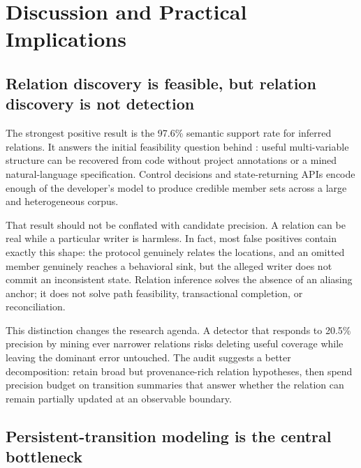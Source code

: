 
\section{Discussion and Practical Implications}
\label{s:discussion}

\subsection{Relation discovery is feasible, but relation discovery is not detection}
\label{s:discussion-relations}

The strongest positive result is the 97.6\% semantic support rate for inferred relations. It answers the initial feasibility question behind \sys: useful multi-variable structure can be recovered from code without project annotations or a mined natural-language specification. Control decisions and state-returning APIs encode enough of the developer's model to produce credible member sets across a large and heterogeneous corpus.

That result should not be conflated with candidate precision. A relation can be real while a particular writer is harmless. In fact, most false positives contain exactly this shape: the protocol genuinely relates the locations, and an omitted member genuinely reaches a behavioral sink, but the alleged writer does not commit an inconsistent state. Relation inference solves the absence of an aliasing anchor; it does not solve path feasibility, transactional completion, or reconciliation.

This distinction changes the research agenda. A detector that responds to 20.5\% precision by mining ever narrower relations risks deleting useful coverage while leaving the dominant error untouched. The audit suggests a better decomposition: retain broad but provenance-rich relation hypotheses, then spend precision budget on transition summaries that answer whether the relation can remain partially updated at an observable boundary.

\subsection{Persistent-transition modeling is the central bottleneck}
\label{s:discussion-transitions}

